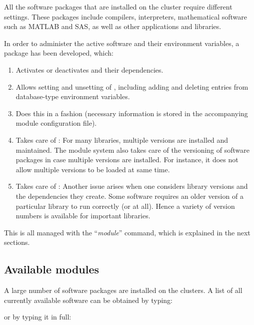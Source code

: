 All the software packages that are installed on the \hpc cluster require
different settings. These packages include compilers, interpreters,
mathematical software such as MATLAB and SAS, as well as other applications and
libraries.

In order to administer the active software and their environment variables, a
 package has been developed, which:

\begin{enumerate}
\item  Activates or deactivates  and their dependencies.
\item  Allows setting and unsetting of , including adding and deleting entries from database-type environment variables.
\item  Does this in a  fashion (necessary information is stored in the accompanying module configuration file).
\item  Takes care of : For many libraries, multiple versions are installed and maintained. The module system also takes care of the versioning of software packages in case multiple versions are installed. For instance, it does not allow multiple versions to be loaded at same time.
\item  Takes care of : Another issue arises when one considers library versions and the dependencies they create. Some software requires an older version of a particular library to run correctly (or at all). Hence a variety of version numbers is available for important libraries.
\end{enumerate}

This is all managed with the ``\emph{module}'' command, which is explained in the next sections.

\subsection{Available modules}

A large number of software packages are installed on the \hpc clusters. A
list of all currently available software can be obtained by typing:

\begin{prompt}
\end{prompt}

or by typing it in full:

\begin{prompt}
\end{prompt}

